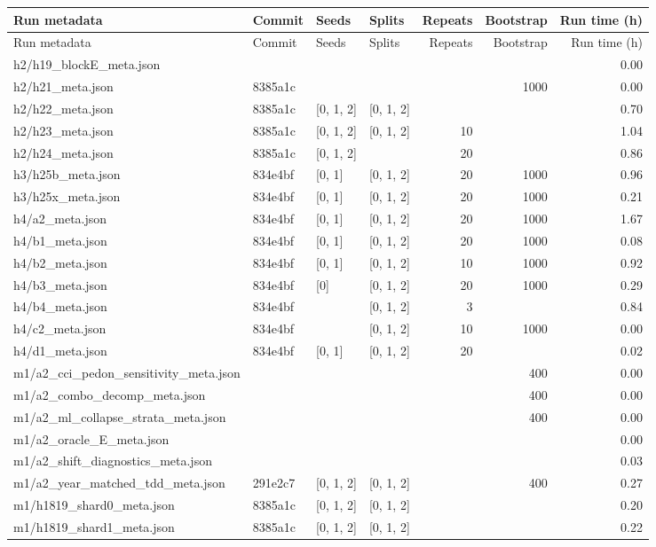 \begin{longtable}{llllrrr}
\toprule
Run metadata & Commit & Seeds & Splits & Repeats & Bootstrap & Run time (h) \\
\midrule
\endfirsthead
\toprule
Run metadata & Commit & Seeds & Splits & Repeats & Bootstrap & Run time (h) \\
\midrule
\endhead
h2/h19\_blockE\_meta.json &  &  &  &  &  & 0.00 \\
h2/h21\_meta.json & 8385a1c &  &  &  & 1000 & 0.00 \\
h2/h22\_meta.json & 8385a1c & [0, 1, 2] & [0, 1, 2] &  &  & 0.70 \\
h2/h23\_meta.json & 8385a1c & [0, 1, 2] & [0, 1, 2] & 10 &  & 1.04 \\
h2/h24\_meta.json & 8385a1c & [0, 1, 2] &  & 20 &  & 0.86 \\
h3/h25b\_meta.json & 834e4bf & [0, 1] & [0, 1, 2] & 20 & 1000 & 0.96 \\
h3/h25x\_meta.json & 834e4bf & [0, 1] & [0, 1, 2] & 20 & 1000 & 0.21 \\
h4/a2\_meta.json & 834e4bf & [0, 1] & [0, 1, 2] & 20 & 1000 & 1.67 \\
h4/b1\_meta.json & 834e4bf & [0, 1] & [0, 1, 2] & 20 & 1000 & 0.08 \\
h4/b2\_meta.json & 834e4bf & [0, 1] & [0, 1, 2] & 10 & 1000 & 0.92 \\
h4/b3\_meta.json & 834e4bf & [0] & [0, 1, 2] & 20 & 1000 & 0.29 \\
h4/b4\_meta.json & 834e4bf &  & [0, 1, 2] & 3 &  & 0.84 \\
h4/c2\_meta.json & 834e4bf &  & [0, 1, 2] & 10 & 1000 & 0.00 \\
h4/d1\_meta.json & 834e4bf & [0, 1] & [0, 1, 2] & 20 &  & 0.02 \\
m1/a2\_cci\_pedon\_sensitivity\_meta.json &  &  &  &  & 400 & 0.00 \\
m1/a2\_combo\_decomp\_meta.json &  &  &  &  & 400 & 0.00 \\
m1/a2\_ml\_collapse\_strata\_meta.json &  &  &  &  & 400 & 0.00 \\
m1/a2\_oracle\_E\_meta.json &  &  &  &  &  & 0.00 \\
m1/a2\_shift\_diagnostics\_meta.json &  &  &  &  &  & 0.03 \\
m1/a2\_year\_matched\_tdd\_meta.json & 291e2c7 & [0, 1, 2] & [0, 1, 2] &  & 400 & 0.27 \\
m1/h1819\_shard0\_meta.json & 8385a1c & [0, 1, 2] & [0, 1, 2] &  &  & 0.20 \\
m1/h1819\_shard1\_meta.json & 8385a1c & [0, 1, 2] & [0, 1, 2] &  &  & 0.22 \\

\end{longtable}
